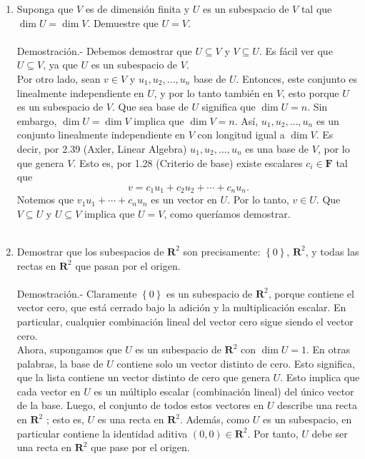 \begin{enumerate}[\bfseries 1.]

    \item Suponga que $V$ es de dimensión finita y $U$ es un subespacio de $V$ tal que $\dim U=\dim V$. Demuestre que $U=V$.\\\\
	Demostración.-\; Debemos demostrar que $U\subseteq V$ y $V\subseteq U$. Es fácil ver que $U\subseteq V$, ya que $U$ es un subespacio de $V$.\\
	Por otro lado, sean $v\in V$ y $u_1,u_2,\ldots,u_n$ base de $U$. Entonces, este conjunto es linealmente independiente en $U$, y por lo tanto también en $V$, esto porque $U$ es un subespacio de $V$. Que sea base de $U$ significa que $\dim U =n.$ Sin embargo, $\dim U = \dim V$ implica que $\dim V = n$. Así, $u_1,u_2,\ldots,u_n$ es un conjunto linealmente independiente en $V$ con longitud igual a $\dim V$. Es decir, por 2.39 (Axler, Linear Algebra) $u_1,u_2,\ldots,u_n$ es una base de $V$, por lo que genera $V$. Esto es, por 1.28 (Criterio de base) existe escalares $c_i\in \textbf{F}$ tal que
	$$v=c_1u_1+c_2u_2+\cdots+c_nu_n.$$
	Notemos que $v_1u_1+\cdots+c_nu_n$ es un vector en $U$. Por lo tanto, $v\in U$. Que $V\subseteq U$ y $U\subseteq V$ implica que $U=V$, como queríamos demostrar.\\\\

    \item Demostrar que los subespacios de $\textbf{R}^2$ son precisamente: $\left\{0\right\}$, $\textbf{R}^2$, y todas las rectas en $\textbf{R}^2$ que pasan por el origen.\\\\
	Demostración.-\; Claramente $\left\{0\right\}$ es un subespacio de $\textbf{R}^2$, porque contiene el vector cero, que está cerrado bajo la adición y la multiplicación escalar. En particular, cualquier combinación lineal del vector cero sigue siendo el vector cero.\\

	Ahora, supongamos que $U$ es un subespacio de $\textbf{R}^2$ con $\dim U = 1$. En otras palabras, la base de $U$ contiene solo un vector distinto de cero. Esto significa, que la lista contiene un vector distinto de cero que genera $U$. Esto implica que cada vector en $U$ es un múltiplo escalar (combinación lineal) del único vector de la base. Luego,  el conjunto de todos estos vectores en $U$ describe una recta en $\textbf{R}^2$ ; esto es, $U$ es una recta en $\textbf{R}^2$. Además, como $U$ es un subespacio, en particular contiene la identidad aditiva $(0, 0) \in \textbf{R}^2$. Por tanto, $U$ debe ser una recta en $\textbf{R}^2$ que pase por el origen.\\


\end{enumerate}

